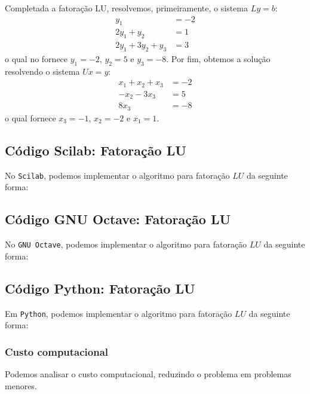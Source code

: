 \begin{sol}
Completada a fatoração LU, resolvemos, primeiramente, o sistema $Ly = b$:
\begin{equation}
  \begin{split}
    y_1 &= -2\\
    2y_1 + y_2 &= 1\\
    2y_1 + 3y_2 + y_3 &= 3
  \end{split}
\end{equation}
o qual no fornece $y_1 = -2$, $y_2 = 5$ e $y_3 = -8$. Por fim, obtemos a solução resolvendo o sistema $Ux = y$:
\begin{equation}
  \begin{split}
  x_1 + x_2 + x_3 &= -2\\
  -x_2 - 3x_3 &= 5\\
  8x_3 &= -8
  \end{split}
\end{equation}
o qual fornece $x_3 = -1$, $x_2 = -2$ e $x_1 = 1$.
\end{sol}

\ifisscilab
\subsection{Código Scilab: Fatoração LU}
No \verb+Scilab+, podemos implementar o algoritmo para fatoração $LU$ da seguinte forma:
%

\fi
\ifisoctave
\subsection{Código GNU Octave: Fatoração LU}
No \verb+GNU Octave+, podemos implementar o algoritmo para fatoração $LU$ da seguinte forma:

\fi
\ifispython
\subsection{Código Python: Fatoração LU}
Em \verb+Python+, podemos implementar o algoritmo para fatoração $LU$ da seguinte forma:

\fi

\ifisscilab
\subsubsection{Custo computacional}
Podemos analisar o custo computacional, reduzindo o problema em problemas menores. %

